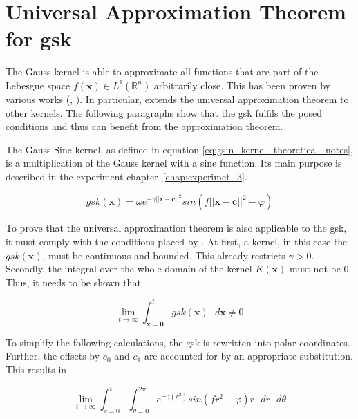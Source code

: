 \documentclass[./\jobname.tex]{subfiles}
\begin{document}
\section{Universal Approximation Theorem for \gls{gsk}}
\label{chap:gsin_approximation_theorem}

The Gauss kernel is able to approximate all functions that are part of the Lebesgue space $f(\mathbf{x}) \in L^1(\mathbb{R}^n)$ arbitrarily close. This has been proven by various works (\cite{park_universal_1991}, \cite{hangelbroek_nonlinear_2010}). In particular, \cite{park_universal_1991} extends the universal approximation theorem to other kernels. The following paragraphs show that the \gls{gsk} fulfils the posed conditions and thus can benefit from the approximation theorem. 

The Gauss-Sine kernel, as defined in equation \eqref{eq:gsin_kernel_theoretical_notes}, is a multiplication of the Gauss kernel with a sine function. Its main purpose is described in the experiment \mbox{chapter \ref{chap:experimet_3}}. 

\begin{equation}
\label{eq:gsin_kernel_theoretical_notes}
gsk(\mathbf{x}) = \omega e^{-\gamma ||\mathbf{x} - \mathbf{c}||^2} sin(f ||\mathbf{x} - \mathbf{c}||^2 - \varphi)
\end{equation}

To prove that the universal approximation theorem is also applicable to the \gls{gsk}, it must comply with the conditions placed by \cite{park_universal_1991}. At first, a kernel, in this case the $gsk(\mathbf{x})$, must be continuous and bounded. This already restricts $\gamma > 0$. Secondly, the integral over the whole domain of the kernel $K(\mathbf{x})$ must not be $0$. Thus, it needs to be shown that 

\begin{equation}
\lim_{t \to \infty} \int_{\mathbf{x} = \mathbf{0}}^{t} gsk(\mathbf{x}) \text{ } d\mathbf{x} \neq 0
\end{equation} 

To simplify the following calculations, the \gls{gsk} is rewritten into polar coordinates. Further, the offsets by $c_0$ and $c_1$ are accounted for by an appropriate substitution. This results in 

\begin{equation}
\lim_{t \to \infty} \int_{r=0}^{t} \int_{\theta = 0}^{2 \pi} e^{-\gamma(r^2)} sin(f r^2 - \varphi) r \text{ } dr \text{ } d\theta
\end{equation}
\end{document}
